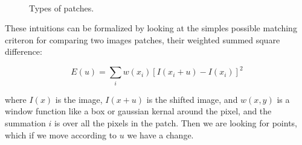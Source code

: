 \documentclass[12pt, a4paper, titlepage,twoside,openright]{article}
\begin{document}
\begin{figure}[H]
		
\centering

\\


\caption{Types of patches.}
\label{patches}
\end{figure}

These intuitions can be formalized by looking at the simples possible matching criteron for comparing two images patches, their weighted summed square difference:


$$ E(u) = \sum_{i} w(x_{i}) [I(x_{i}+u)-I(x_{i})]^{2}$$

where $I(x)$ is the image, $I(x+u)$ is the shifted image, and $w(x,y)$ is a window function like a box or gaussian kernal around the pixel, and the summation $i$ is over all the pixels in the patch. Then we are looking for points, which if we move according to $u$ we have a change. 
\end{document}
